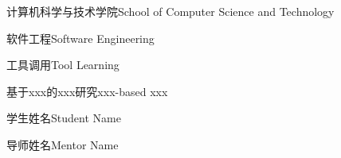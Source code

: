 
\school
{计算机科学与技术学院}{School of Computer Science and Technology}

\major
{软件工程}{Software Engineering}

\direct
{工具调用}{Tool Learning}

\thesistitle
{基于xxx的xxx研究}{xxx-based xxx} %

\thesisauthor
{学生姓名}{Student Name}

\teacher
{导师姓名}{Mentor Name}





